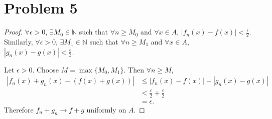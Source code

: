 \documentclass{article}
\newcommand{\N}{\mathbb{N}} %
\begin{document}
\section*{Problem 5}
\begin{proof}
	$\forall \epsilon > 0$, $\exists M_0 \in \N$ such that $\forall n \geq M_0$ and $\forall x \in A$, $|f_n(x) - f(x)| < \frac{\epsilon}{2}$. Similarly, $\forall \epsilon > 0$, $\exists M_1 \in \N$ such that $\forall n \geq M_1$ and $\forall x \in A$, $|g_n(x) - g(x)| < \frac{\epsilon}{2}$. 
	
	Let $\epsilon > 0$. Choose $M = \max\{M_0, M_1\}$. Then $\forall n \geq M$, 
	\begin{align}
		|f_n(x) +g_n(x) - (f(x) + g(x))| & \leq |f_n(x) - f(x)| + |g_n(x) - g(x)| \\
		& < \frac{\epsilon}{2} + \frac{\epsilon}{2} \\
		&= \epsilon.
	\end{align}
	Therefore $f_n + g_n \to f + g$ uniformly on $A$.
\end{proof}
\end{document}
